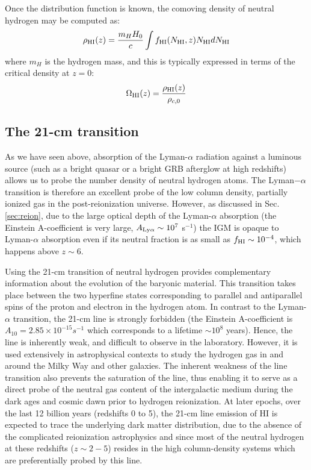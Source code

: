 Once the distribution function is known, the comoving density of neutral hydrogen may be computed as:
\begin{equation}
 \rho_{\rm HI} (z) = \frac{m_H H_0}{c} \int f_{\rm HI}(N_{\rm HI}, z) N_{\rm HI} d N_{\rm HI}
\end{equation} 
where $m_H$ is the hydrogen mass,
and this is typically expressed in terms of the critical density at $z = 0$:
\begin{equation}
 \Omega_{\rm HI} (z) = \frac{\rho_{\rm HI} (z)}{\rho_{c,0}}
\end{equation} 



\subsection{The 21-cm transition}
\label{sec:21cmintro}

As we have seen above, absorption of the Lyman-$\alpha$ radiation against a luminous source (such as a bright quasar or a bright GRB afterglow at high redshifts) allows us to probe the number density of neutral hydrogen atoms. The Lyman$-\alpha$ transition is therefore an excellent probe of the low column density, partially ionized gas in the post-reionization universe. However, as discussed in Sec. \ref{sec:reion}, due to the large optical depth of the Lyman-$\alpha$ absorption (the Einstein A-coefficient is very large, $A_{{\rm{Ly}} \alpha} \sim 10^{7}$ s$^{-1}$) the IGM is opaque to Lyman-$\alpha$ absorption even if its neutral fraction is as small as $f_{\rm HI} \sim 10^{-4}$, which happens above $z \sim 6$. 

Using the 21-cm transition of neutral hydrogen provides complementary information about the evolution of the baryonic material. This transition takes place between the two hyperfine states corresponding to parallel and antiparallel spins of the proton and electron in the hydrogen atom. 
In contrast to the Lyman-$\alpha$ transition, the 21-cm line is strongly forbidden (the Einstein A-coefficient is $A_{10} = 2.85 \times 10^{-15} s^{-1}$ which corresponds to a lifetime $\sim 10^8$ years). Hence, the line is inherently weak, and difficult to observe in the laboratory. However, it is used extensively in  astrophysical contexts to study the hydrogen gas in and around the Milky Way and other galaxies. The inherent weakness of the line transition also prevents the saturation of the line, thus enabling it to serve as a direct probe of the neutral gas content of the intergalactic medium during the dark 
ages and cosmic dawn prior to hydrogen reionization. At later epochs, over the last 12 billion years (redshifts 0 to 5), the 21-cm line emission of HI is expected to trace the underlying dark matter distribution, due to the absence of the complicated reionization astrophysics \cite{bharadwaj2001a, bharadwaj2001, bharadwaj2004, wyithe2008, wyithe2009, bharadwaj2009, wyithe2010} and since most of the neutral hydrogen at these redshifts ($z \sim 2-5$) resides in the high column-density systems which are preferentially probed by this line. 

